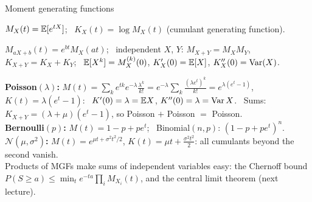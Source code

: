 \documentclass[aspectratio=1610,11pt]{beamer}
\begin{document}
\begin{frame}{Moment generating functions}
    \begin{definition}
        \small $M_X(t) = \mathbb{E}[e^{tX}]$; \ $K_X(t) = \log M_X(t)$ (cumulant generating function).
    \end{definition}
    \begin{proposition}
        \small $M_{aX + b}(t) = e^{bt}M_X(at)$; \ independent $X$, $Y$: $M_{X+Y} = M_XM_Y$, $K_{X+Y} = K_X + K_Y$; \ $\mathbb{E}[X^k] = M_X^{(k)}(0)$, $K_X'(0) = \mathbb{E}[X]$, $K_X''(0) = \operatorname{Var}(X)$.
    \end{proposition}
    \small
    \textbf{Poisson$(\lambda)$:} $M(t) = \sum_ke^{tk}e^{-\lambda}\frac{\lambda^k}{k!} = e^{-\lambda}\sum_k\frac{(\lambda e^t)^k}{k!} = e^{\lambda(e^t - 1)}$, \ $K(t) = \lambda(e^t - 1)$: \ $K'(0) = \lambda = \mathbb{E} X$, $K''(0) = \lambda = \operatorname{Var} X$. \ Sums: $K_{X+Y} = (\lambda + \mu)(e^t - 1)$, so Poisson $+$ Poisson $=$ Poisson.
    \\[0.3em]
    \textbf{Bernoulli$(p)$:} $M(t) = 1 - p + pe^t$; \ Binomial$(n, p)$: $(1 - p + pe^t)^n$.
    \\[0.3em]
    \textbf{$\mathcal{N}(\mu, \sigma^2)$:} $M(t) = e^{\mu t + \sigma^2t^2/2}$, $K(t) = \mu t + \frac{\sigma^2t^2}{2}$: all cumulants beyond the second vanish.
    \\[0.3em]
    Products of MGFs make sums of independent variables easy: the Chernoff bound $P(S \geq a) \leq \min_te^{-ta}\prod_iM_{X_i}(t)$, and the central limit theorem (next lecture).
\end{frame}

\end{document}
